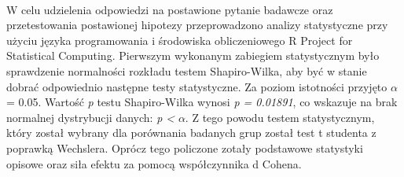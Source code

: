 \documentclass[12pt,a4paper,final,oneside,onecolumn,titlepage]{article}
\begin{document}
\paragraph{}
W celu udzielenia odpowiedzi na postawione pytanie badawcze oraz przetestowania postawionej hipotezy przeprowadzono analizy statystyczne przy użyciu języka programowania i środowiska obliczeniowego R Project for Statistical Computing. Pierwszym wykonanym zabiegiem statystycznym było sprawdzenie normalności rozkładu testem Shapiro-Wilka, aby być w stanie dobrać odpowiednio następne testy statystyczne. Za poziom istotności przyjęto $\alpha$ = 0.05. Wartość \textit{p} testu Shapiro-Wilka wynosi \textit{p = 0.01891}, co wskazuje na brak normalnej dystrybucji danych: \textit{p <} $\alpha$. Z tego powodu testem statystycznym, który został wybrany dla porównania badanych grup został test t studenta z poprawką Wechslera. Oprócz tego policzone zotały podstawowe statystyki opisowe oraz siła efektu za pomocą współczynnika d Cohena.
\newpage

\end{document}
